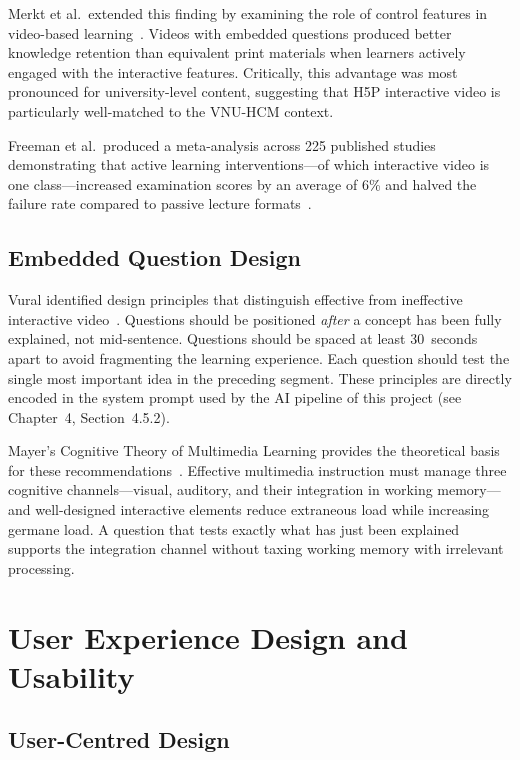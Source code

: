 Merkt et al.\ extended this finding by examining the role of control
features in video-based learning~\cite{merkt2011}. Videos with embedded
questions produced better knowledge retention than equivalent print materials
when learners actively engaged with the interactive features. Critically,
this advantage was most pronounced for university-level content, suggesting
that H5P interactive video is particularly well-matched to the VNU-HCM
context.

Freeman et al.\ produced a meta-analysis across 225 published studies
demonstrating that active learning interventions---of which interactive video
is one class---increased examination scores by an average of 6\% and halved
the failure rate compared to passive lecture formats~\cite{freeman2014}.

\subsection{Embedded Question Design}

Vural identified design principles that distinguish effective from
ineffective interactive video~\cite{vural2013}. Questions should be
positioned \emph{after} a concept has been fully explained, not
mid-sentence. Questions should be spaced at least 30~seconds apart to
avoid fragmenting the learning experience. Each question should test the
single most important idea in the preceding segment. These principles are
directly encoded in the system prompt used by the AI pipeline of this
project (see Chapter~4, Section~4.5.2).

Mayer's Cognitive Theory of Multimedia Learning provides the theoretical
basis for these recommendations~\cite{mayer2009}. Effective multimedia
instruction must manage three cognitive channels---visual, auditory, and
their integration in working memory---and well-designed interactive
elements reduce extraneous load while increasing germane load. A question
that tests exactly what has just been explained supports the integration
channel without taxing working memory with irrelevant processing.

\section{User Experience Design and Usability}

\subsection{User-Centred Design}

